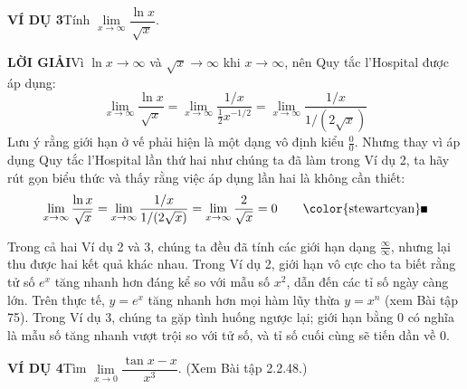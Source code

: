 \begin{minipage}[t]{0.70\textwidth}
    \vspace{0pt}%
    \noindent
    \textbf{\textsf{\color{stewartcyan}VÍ DỤ 3}}\quad Tính $\lim\limits_{x \to \infty} \dfrac{\ln x}{\sqrt{x}}$.

    \vspace{0.4em}
    \noindent
    \textbf{\textsf{\color{stewartcyan}LỜI GIẢI}}\quad Vì $\ln x \to \infty$ và $\sqrt{x} \to \infty$ khi $x \to \infty$, nên Quy tắc l'Hospital được áp dụng:
    \[
    \lim_{x \to \infty} \frac{\ln x}{\sqrt{x}} = \lim_{x \to \infty} \frac{1/x}{\frac{1}{2}x^{-1/2}} = \lim_{x \to \infty} \frac{1/x}{1/(2\sqrt{x})}
    \]
    Lưu ý rằng giới hạn ở vế phải hiện là một dạng vô định kiểu $\frac{0}{0}$. Nhưng thay vì áp dụng Quy tắc l'Hospital lần thứ hai như chúng ta đã làm trong Ví dụ 2, ta hãy rút gọn biểu thức và thấy rằng việc áp dụng lần hai là không cần thiết:
    \begin{equation*}
    \lim_{x \to \infty} \frac{\ln x}{\sqrt{x}} = \lim_{x \to \infty} \frac{1/x}{1/(2\sqrt{x})} = \lim_{x \to \infty} \frac{2}{\sqrt{x}} = 0 \tag*{\color{stewartcyan}\rule{1.1ex}{1.1ex}}
    \end{equation*}

    \vspace{0.4em}
    \noindent
    Trong cả hai Ví dụ 2 và 3, chúng ta đều đã tính các giới hạn dạng $\frac{\infty}{\infty}$, nhưng lại thu được hai kết quả khác nhau. Trong Ví dụ 2, giới hạn vô cực cho ta biết rằng tử số $e^x$ tăng nhanh hơn đáng kể so với mẫu số $x^2$, dẫn đến các tỉ số ngày càng lớn. Trên thực tế, $y = e^x$ tăng nhanh hơn mọi hàm lũy thừa $y = x^n$ (xem Bài tập 75). Trong Ví dụ 3, chúng ta gặp tình huống ngược lại; giới hạn bằng 0 có nghĩa là mẫu số tăng nhanh vượt trội so với tử số, và tỉ số cuối cùng sẽ tiến dần về 0.

    \vspace{1.2em}
    \noindent
    \textbf{\textsf{\color{stewartcyan}VÍ DỤ 4}}\quad Tìm $\lim\limits_{x \to 0} \dfrac{\tan x - x}{x^3}$. (Xem Bài tập 2.2.48.)


\end{minipage}
